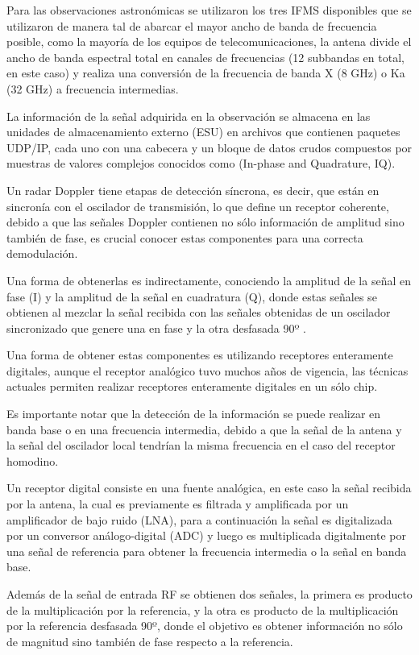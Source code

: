 Para las observaciones astronómicas se utilizaron los tres IFMS disponibles que se utilizaron de manera tal de abarcar el mayor ancho de banda de frecuencia posible, como la mayoría de los equipos de telecomunicaciones, la antena divide el ancho de banda espectral total en canales de frecuencias (12 subbandas en total, en este caso) y realiza una conversión de la frecuencia de banda X (8 GHz) o Ka (32 GHz) a frecuencia intermedias.

La información de la señal adquirida en la observación se almacena en las unidades de almacenamiento externo (ESU) en archivos que contienen paquetes UDP/IP, cada uno con una cabecera y un bloque de datos crudos compuestos por muestras de valores complejos conocidos como (In-phase and Quadrature, IQ). 

Un radar Doppler tiene etapas de detección síncrona, es decir, que están en sincronía con el oscilador de transmisión, lo que define un receptor coherente, debido a que las señales Doppler contienen no sólo información de amplitud sino también de fase, es crucial conocer estas componentes para una correcta demodulación. 

Una forma de obtenerlas es indirectamente, conociendo la amplitud de la señal en fase (I) y la amplitud de la señal en cuadratura (Q), donde estas señales se obtienen al mezclar la señal recibida con las señales obtenidas de un oscilador sincronizado que genere una en fase y la otra desfasada 90º \cite{CastilloPlasencia2016Oct}.

Una forma de obtener estas componentes es utilizando receptores enteramente digitales, aunque el receptor analógico tuvo muchos años de vigencia, las técnicas actuales permiten realizar receptores enteramente digitales en un sólo chip.

Es importante notar que la detección de la información se puede realizar en banda base o en una frecuencia intermedia, debido a que la señal de la antena y la señal del oscilador local tendrían la misma frecuencia en el caso del receptor homodino. 

Un receptor digital consiste en una fuente analógica, en este caso la señal recibida por la antena, la cual es previamente es filtrada y amplificada por un amplificador de bajo ruido (LNA), para a continuación la señal es digitalizada por un conversor análogo-digital (ADC) y luego es multiplicada digitalmente por una señal de referencia para obtener la frecuencia intermedia o la señal en banda base. 

Además de la señal de entrada RF se obtienen dos señales, la primera es producto de la multiplicación por la referencia, y la otra es producto de la multiplicación por la referencia desfasada 90º, donde el objetivo es obtener información no sólo de magnitud sino también de fase respecto a la referencia.

